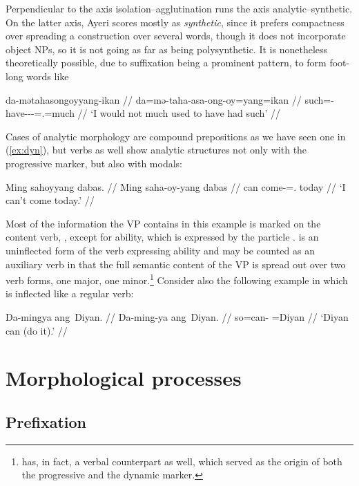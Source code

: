 Perpendicular to the axis isolation–agglutination runs the axis 
analytic–syn\-thetic. On the latter axis, Ayeri scores mostly as 
\emph{synthetic}, since it prefers compactness over spreading a construction 
over several words, though it does not incorporate object NPs, so it is not 
going as far as being poly\-syn\-thetic. It is nonetheless theoretically 
possible, due to suffixation being a prominent pattern, to form foot-long words 
like

\ex\label{ex:footlong}\begingl
	\gla da-mətahasongoyyang-ikan //
	\glb da=mə-taha-asa-ong-oy=yang=ikan //
	\glc such=\Pst{}-have-\Hab{}-\Irr{}-\Neg{}=\Fsg{}.\Aarg{}=much //
	\glft `I would not much used to have had such' //
\endgl\xe

Cases of analytic morphology are compound prepositions as we have seen 
one in (\ref{ex:dyn}), but verbs as well show analytic structures not only with 
the progressive marker, but also with modals:

\ex\begingl
	\gla Ming sahoyyang dabas. //
	\glb Ming saha-oy-yang dabas //
	\glc can come-\Neg{}=\Fsg{}.\Aarg{} today //
	\glft `I can't come today.' //
\endgl\xe

Most of the information the VP contains in this example is marked on the 
content verb, , except for ability, which is expressed 
by the particle .  is an uninflected form 
of the verb expressing ability and may be counted as an auxiliary verb in 
that the full semantic content of the VP is spread out over two verb forms, 
one major, one minor.\footnote{ has, in fact, a verbal 
counterpart  as well, which served as the origin 
of both the progressive and the dynamic marker.} Consider also the following 
example in which  is inflected like a regular verb:

\ex\begingl
	\gla Da-mingya ang~Diyan. //
	\glb Da-ming-ya ang~Diyan. //
	\glc so=can-\TsgM{} \Aarg{}=Diyan //
	\glft `Diyan can (do it).' //
\endgl\xe

\section{Morphological processes}

\subsection{Prefixation}

